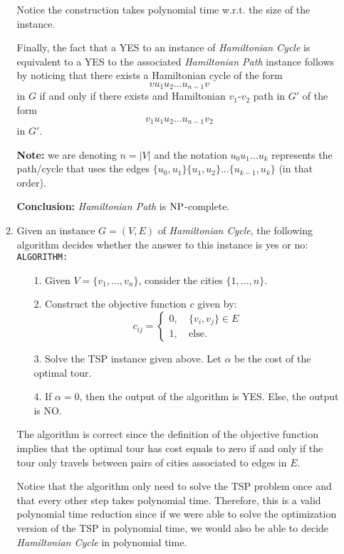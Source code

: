 \documentclass[../open-optimization/open-optimization.tex]{subfiles}
\begin{document}
\begin{enumerate}
\begin{enumerate}
	Notice the construction takes polynomial time w.r.t. the size of the instance.
	
	Finally, the fact that a YES to an instance of {\em Hamiltonian Cycle} is equivalent to a YES to the associated {\em Hamiltonian Path} instance follows by noticing that there exists a Hamiltonian cycle of the form
	$$vu_1u_2\dots u_{n-1}v$$
	in $G$ if and only if there exists and Hamiltonian $v_1$-$v_2$ path in $G'$ of the form
	$$v_1u_1u_2\dots u_{n-1}v_2$$	
	in $G'$.
	
	{\bf Note:} we are denoting $n=|V|$ and the notation $u_0u_1\dots u_k$ represents the path/cycle that uses the edges $\{u_0,u_1\}\{u_1,u_2\}\dots \{u_{k-1},u_k\}$ (in that order).
	
{\bf Conclusion:}	{\em Hamiltonian Path} is $\text{NP}$-complete.
	
	\item 	Given an instance $G=(V,E)$ of {\em Hamiltonian Cycle}, the following algorithm decides whether the answer to this instance is yes or no:\\
	
	{\tt ALGORITHM:}
	\begin{itemize}
	  \item[1.] Given $V=\{v_1,\dots,v_n\}$, consider the cities $\{1,\dots,n\}$.
		\item[2.] Construct the objective function $c$ given by:
		$$c_{ij}=\begin{cases}0,\ & \{v_i,v_j\}\in E\\ 1,\ & \text{else.}\end{cases}$$
		\item[3.] Solve the TSP instance given above. Let $\alpha$ be the cost of the optimal tour.
		\item[4.] If $\alpha=0$, then the output of the algorithm is YES. Else, the output is NO.
	\end{itemize}
	
	The algorithm is correct since the definition of the objective function implies that the optimal tour has cost equals to zero if and only if the tour only travels between pairs of cities associated to edges in $E$. 
	
	Notice that the algorithm only need to solve the TSP problem once and that every other step takes polynomial time. Therefore, this is a valid polynomial time reduction since if we were able to solve the  optimization version of the TSP in polynomial time, we would also be able to decide {\em Hamiltonian Cycle} in polynomial time.


\end{enumerate}
\end{enumerate}
\end{document}

